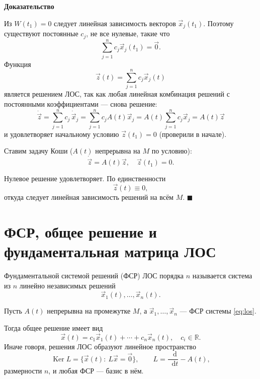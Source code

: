\documentclass[12pt,a4paper]{article}
\numberwithin{equation}{section}
\newcommand{\R}{\mathbb{R}}
\newcommand{\vect}[1]{\vec{#1}}
\newcommand{\dd}{\mathop{}\!\mathrm{d}}
\renewenvironment{proof}[1][Доказательство]{\begin{center}\textbf{#1}\end{center}}{\hfill$\blacksquare$\par}
\begin{document}
\begin{proof}
Из $W(t_1)=0$ следует линейная зависимость векторов $\vect{x}_j(t_1)$. Поэтому существуют постоянные $c_j$, не все нулевые, такие что
\[
\sum_{j=1}^{n}c_j\vect{x}_j(t_1)=\vect{0}.
\]
Функция
\[
\vect{z}(t)=\sum_{j=1}^{n}c_j\vect{x}_j(t)
\]
является решением ЛОС, так как любая линейная комбинация решений с постоянными коэффициентами --- снова решение:
\[
\dot{\vect{z}}
= \sum_{j=1}^{n} c_j\,\dot{\vect{x}}_j
= \sum_{j=1}^{n} c_j A(t)\vect{x}_j
= A(t)\sum_{j=1}^{n} c_j\vect{x}_j
= A(t)\vect{z}
\]
и удовлетворяет начальному условию $\vect{z}(t_1)=0$ (проверили в начале). 

Ставим задачу Коши (\(A(t)\) непрерывна на \(M\) по условию):
\[
\dot{\vect{z}} = A(t)\vect{z}, \quad \vect{z}(t_1) = 0.
\]

Нулевое решение удовлетворяет. По единственности
\[
\vect{z}(t)\equiv0,
\]
откуда следует линейная зависимость решений на всём $M$.
\end{proof}

\section[ФСР и фундаментальная матрица]{ФСР, общее решение и фундаментальная матрица ЛОС}

\begin{definitionHSE}
Фундаментальной системой решений (ФСР) ЛОС порядка $n$ называется система из $n$ линейно независимых решений
\[
\vect{x}_1(t),\ldots,\vect{x}_n(t).
\]
\end{definitionHSE}

\begin{theoremHSE}
Пусть $A(t)$ непрерывна на промежутке $M$, а $\vect{x}_1,\ldots,\vect{x}_n$ --- ФСР системы \eqref{eq:los}.

Тогда общее решение имеет вид
\[
\vect{x}(t)=c_1\vect{x}_1(t)+\cdots+c_n\vect{x}_n(t),
\quad c_i\in\R.
\]
Иначе говоря, решения ЛОС образуют линейное пространство
\[
\operatorname{Ker}L=\bigl\{\vect{x}(t):\ L\vect{x}=\vect{0}\bigr\},\qquad L=\frac{\dd}{\dd t}-A(t),
\]
размерности $n$, и любая ФСР --- базис в нём.
\end{theoremHSE}
\end{document}
